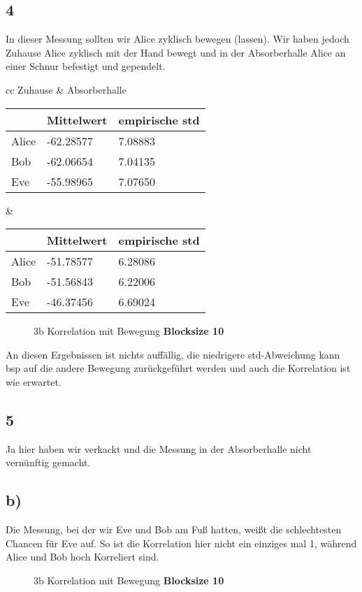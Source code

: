 \documentclass[12pt,a4paper]{article}
\begin{document}
\subsection*{4}
In dieser Messung sollten wir Alice zyklisch bewegen (lassen). Wir haben jedoch Zuhause Alice zyklisch mit der Hand bewegt und in der Absorberhalle Alice an einer Schnur befestigt und gependelt.
\begin{table}[H]
\centering
\begin{tabular}{ cc }
Zuhause & Absorberhalle  \\
\begin{tabular}{l|l|l}
& Mittelwert & empirische std \\
\hline
Alice & -62.28577 & 7.08883 \\
\hline
Bob & -62.06654 & 7.04135 \\
\hline
Eve & -55.98965 & 7.07650 \\
\end{tabular} &
\begin{tabular}{l|l|l}
& Mittelwert & empirische std \\
\hline
Alice & -51.78577 & 6.28086 \\
\hline
Bob & -51.56843 & 6.22006 \\
\hline
Eve & -46.37456 & 6.69024 \\
\end{tabular}
\end{tabular}
\end{table}
\begin{figure}[H]
\centering
{}   \qquad
{}
\caption{3b Korrelation mit Bewegung  \textbf{Blocksize 10}}
\label{fig:4}
\end{figure}
An diesen Ergebnissen ist nichts auffällig, die niedrigere std-Abweichung kann bsp auf die andere Bewegung zurückgeführt werden und auch die Korrelation ist wie erwartet.
\subsection*{5}
Ja hier haben wir verkackt und die Messung in der Absorberhalle nicht vernünftig gemacht.

\subsection*{b)}
Die Messung, bei der wir Eve und Bob am Fuß hatten, weißt die schlechtesten Chancen für Eve auf. So ist die Korrelation hier nicht ein einziges mal 1, während Alice und Bob hoch Korreliert sind.
\begin{figure}[H]
\centering
{} \qquad
{}  
\caption{3b Korrelation mit Bewegung  \textbf{Blocksize 10}}
\label{fig:4}
\end{figure}
\end{document}
